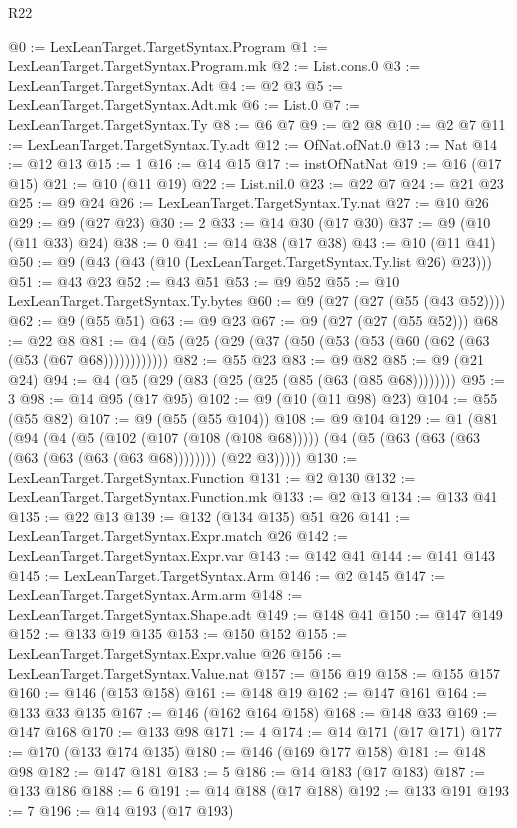 \begin{lexlean}{R22}
\begin{coremodule}
@0 := LexLeanTarget.TargetSyntax.Program
@1 := LexLeanTarget.TargetSyntax.Program.mk
@2 := List.cons.{0}
@3 := LexLeanTarget.TargetSyntax.Adt
@4 := @2 @3
@5 := LexLeanTarget.TargetSyntax.Adt.mk
@6 := List.{0}
@7 := LexLeanTarget.TargetSyntax.Ty
@8 := @6 @7
@9 := @2 @8
@10 := @2 @7
@11 := LexLeanTarget.TargetSyntax.Ty.adt
@12 := OfNat.ofNat.{0}
@13 := Nat
@14 := @12 @13
@15 := 1
@16 := @14 @15
@17 := instOfNatNat
@19 := @16 (@17 @15)
@21 := @10 (@11 @19)
@22 := List.nil.{0}
@23 := @22 @7
@24 := @21 @23
@25 := @9 @24
@26 := LexLeanTarget.TargetSyntax.Ty.nat
@27 := @10 @26
@29 := @9 (@27 @23)
@30 := 2
@33 := @14 @30 (@17 @30)
@37 := @9 (@10 (@11 @33) @24)
@38 := 0
@41 := @14 @38 (@17 @38)
@43 := @10 (@11 @41)
@50 := @9 (@43 (@43 (@10 (LexLeanTarget.TargetSyntax.Ty.list @26) @23)))
@51 := @43 @23
@52 := @43 @51
@53 := @9 @52
@55 := @10 LexLeanTarget.TargetSyntax.Ty.bytes
@60 := @9 (@27 (@27 (@55 (@43 @52))))
@62 := @9 (@55 @51)
@63 := @9 @23
@67 := @9 (@27 (@27 (@55 @52)))
@68 := @22 @8
@81 := @4 (@5 (@25 (@29 (@37 (@50 (@53 (@53 (@60 (@62 (@63 (@53 (@67 @68))))))))))))
@82 := @55 @23
@83 := @9 @82
@85 := @9 (@21 @24)
@94 := @4 (@5 (@29 (@83 (@25 (@25 (@85 (@63 (@85 @68))))))))
@95 := 3
@98 := @14 @95 (@17 @95)
@102 := @9 (@10 (@11 @98) @23)
@104 := @55 (@55 @82)
@107 := @9 (@55 (@55 @104))
@108 := @9 @104
@129 := @1
    (@81
      (@94
        (@4
          (@5 (@102 (@107 (@108 (@108 @68)))))
          (@4 (@5 (@63 (@63 (@63 (@63 (@63 (@63 (@63 @68)))))))) (@22 @3)))))
@130 := LexLeanTarget.TargetSyntax.Function
@131 := @2 @130
@132 := LexLeanTarget.TargetSyntax.Function.mk
@133 := @2 @13
@134 := @133 @41
@135 := @22 @13
@139 := @132 (@134 @135) @51 @26
@141 := LexLeanTarget.TargetSyntax.Expr.match @26
@142 := LexLeanTarget.TargetSyntax.Expr.var
@143 := @142 @41
@144 := @141 @143
@145 := LexLeanTarget.TargetSyntax.Arm
@146 := @2 @145
@147 := LexLeanTarget.TargetSyntax.Arm.arm
@148 := LexLeanTarget.TargetSyntax.Shape.adt
@149 := @148 @41
@150 := @147 @149
@152 := @133 @19 @135
@153 := @150 @152
@155 := LexLeanTarget.TargetSyntax.Expr.value @26
@156 := LexLeanTarget.TargetSyntax.Value.nat
@157 := @156 @19
@158 := @155 @157
@160 := @146 (@153 @158)
@161 := @148 @19
@162 := @147 @161
@164 := @133 @33 @135
@167 := @146 (@162 @164 @158)
@168 := @148 @33
@169 := @147 @168
@170 := @133 @98
@171 := 4
@174 := @14 @171 (@17 @171)
@177 := @170 (@133 @174 @135)
@180 := @146 (@169 @177 @158)
@181 := @148 @98
@182 := @147 @181
@183 := 5
@186 := @14 @183 (@17 @183)
@187 := @133 @186
@188 := 6
@191 := @14 @188 (@17 @188)
@192 := @133 @191
@193 := 7
@196 := @14 @193 (@17 @193)

\end{coremodule}
\end{lexlean}
